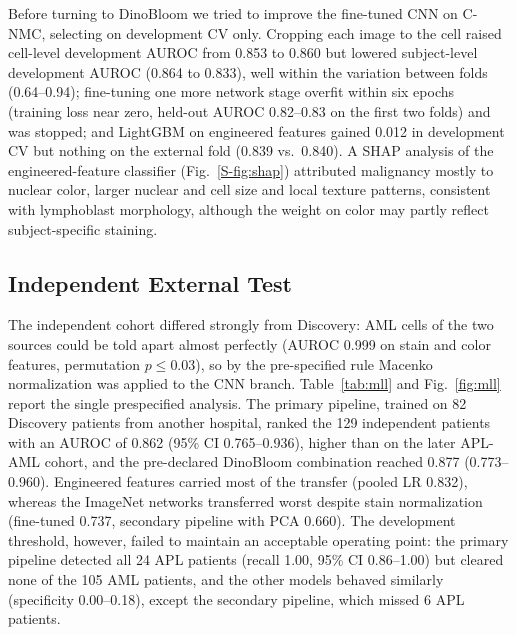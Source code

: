 \documentclass[journal]{IEEEtran}
\begin{document}
Before turning to DinoBloom we tried to improve the fine-tuned CNN on C-NMC, selecting on development CV only. Cropping each image to the cell raised cell-level development AUROC from 0.853 to 0.860 but lowered subject-level development AUROC (0.864 to 0.833), well within the variation between folds (0.64--0.94); fine-tuning one more network stage overfit within six epochs (training loss near zero, held-out AUROC 0.82--0.83 on the first two folds) and was stopped; and LightGBM on engineered features gained 0.012 in development CV but nothing on the external fold (0.839 vs.\ 0.840). A SHAP analysis of the engineered-feature classifier (Fig.~\ref{S-fig:shap}) attributed malignancy mostly to nuclear color, larger nuclear and cell size and local texture patterns, consistent with lymphoblast morphology, although the weight on color may partly reflect subject-specific staining.



\subsection{Independent External Test}
\label{sec:mll}
The independent cohort differed strongly from Discovery: AML cells of the two sources could be told apart almost perfectly (AUROC 0.999 on stain and color features, permutation $p\leq0.03$), so by the pre-specified rule Macenko normalization was applied to the CNN branch. Table~\ref{tab:mll} and Fig.~\ref{fig:mll} report the single prespecified analysis. The primary pipeline, trained on 82 Discovery patients from another hospital, ranked the 129 independent patients with an AUROC of 0.862 (95\% CI 0.765--0.936), higher than on the later APL-AML cohort, and the pre-declared DinoBloom combination reached 0.877 (0.773--0.960). Engineered features carried most of the transfer (pooled LR 0.832), whereas the ImageNet networks transferred worst despite stain normalization (fine-tuned 0.737, secondary pipeline with PCA 0.660). The development threshold, however, failed to maintain an acceptable operating point: the primary pipeline detected all 24 APL patients (recall 1.00, 95\% CI 0.86--1.00) but cleared none of the 105 AML patients, and the other models behaved similarly (specificity 0.00--0.18), except the secondary pipeline, which missed 6 APL patients.
\end{document}
